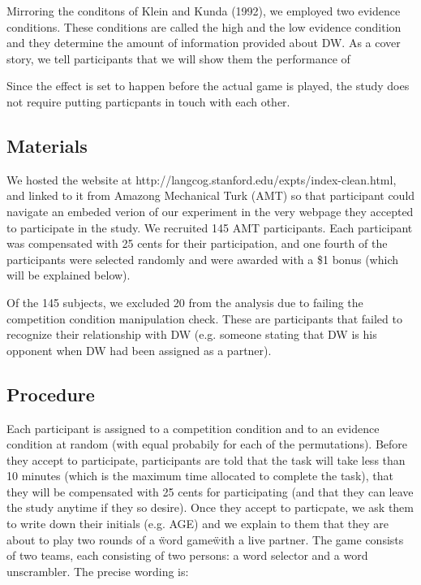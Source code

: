 \documentclass{article}
\begin{document}
Mirroring the conditons of Klein and Kunda (1992), we employed two evidence conditions. These conditions are called the high and the low evidence condition and they determine the amount of information provided about DW. As a cover story, we tell participants that we will show them the performance of

Since the effect is set to happen before the actual game is played, the study does not require putting particpants in touch with each other.

\subsection{Materials}

We hosted the website at http://langcog.stanford.edu/expts/index-clean.html, and linked to it from Amazong Mechanical Turk (AMT) so that participant could navigate an embeded verion of our experiment in the very webpage they accepted to participate in the study. We recruited 145 AMT participants. Each participant was compensated with 25 cents for their participation, and one fourth of the participants were selected randomly and were awarded with a \$1 bonus (which will be explained below).

Of the 145 subjects, we excluded 20 from the analysis due to failing the competition condition manipulation check. These are participants that failed to recognize their relationship with DW (e.g. someone stating that DW is his opponent when DW had been assigned as a partner).


\subsection{Procedure}

Each participant is assigned to a competition condition and to an evidence condition at random (with equal probabily for each of the permutations). Before they accept to participate, participants are told that the task will take less than 10 minutes (which is the maximum time allocated to complete the task), that they will be compensated with 25 cents for participating (and that they can leave the study anytime if they so desire). Once they accept to particpate, we ask them to write down their initials (e.g. AGE) and we explain to them that they are about to play two rounds of a \"word game\" with a live partner. The game consists of two teams, each consisting of two persons: a word selector and a word unscrambler. The precise wording is:
\end{document}

